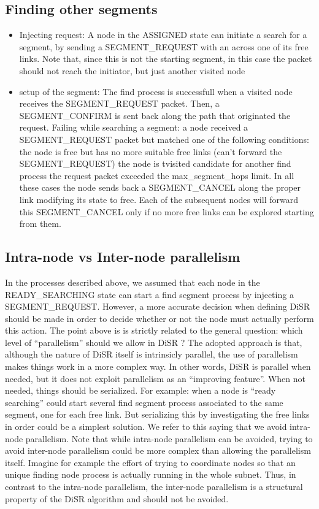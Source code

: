 \documentclass[final,journal,letterpaper]{IEEEtran}
\begin{document}
\subsection{Finding other segments}

\begin{itemize}
\item{Injecting request}: A node in the ASSIGNED state can initiate a search for a
segment, by sending a SEGMENT\_REQUEST with an across one of its free
links. Note that, since this is not the starting segment, in this case
the packet should not reach the initiator, but just another visited
node

\item{setup of the segment}: The find process is successfull when a visited
node receives the SEGMENT\_REQUEST packet. Then, a SEGMENT\_CONFIRM is
sent back along the path that originated the request.  Failing while
searching a segment: a node received a SEGMENT\_REQUEST packet but
matched one of the following conditions: the node is free but has no
more suitable free links (can’t forward the SEGMENT\_REQUEST) the node
is tvisited candidate for another find process the request packet
exceeded the max\_segment\_hops limit.  In all these cases the node
sends back a SEGMENT\_CANCEL along the proper link modifying its state
to free. Each of the subsequent nodes will forward this SEGMENT\_CANCEL
only if no more free links can be explored starting from them.
\end{itemize}


\subsection{Intra-node vs Inter-node parallelism}
In the processes described above, we assumed that each node in the
READY\_SEARCHING state can start a find segment process by injecting a
SEGMENT\_REQUEST. However, a more accurate decision when defining DiSR
should be made in order to decide whether or not the node must
actually perform this action. 
The point above is is strictly related to the general question: which
level of “parallelism” should we allow in DiSR ? The adopted approach
is that, although the nature of DiSR itself is intrinsicly parallel,
the use of parallelism makes things work in a more complex way. In
other words, DiSR is parallel when needed, but it does not exploit
parallelism as an “improving feature”. When not needed, things should
be serialized. For example: when a node is “ready searching” could
start several find segment process associated to the same segment, one
for each free link. But serializing this by investigating the free
links in order could be a simplest solution. We refer to this saying
that we avoid intra-node parallelism.  Note that while intra-node
parallelism can be avoided, trying to avoid inter-node parallelism
could be more complex than allowing the parallelism itself. Imagine
for example the effort of trying to coordinate nodes so that an unique
finding node process is actually running in the whole subnet. Thus, in
contrast to the intra-node parallelism, the inter-node parallelism is
a structural property of the DiSR algorithm and should not be avoided.
\end{document}
